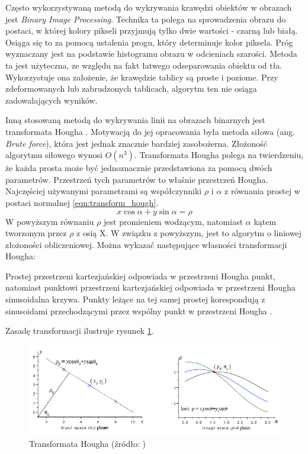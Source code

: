 Często wykorzystywaną metodą do wykrywania krawędzi obiektów w obrazach jest \textit{Binary Image Processing}.
Technika ta polega na sprowadzenia obrazu do postaci, w której kolory pikseli przyjmują tylko dwie wartości - czarną lub białą.
Osiąga się to za pomocą ustalenia progu, który determinuje kolor piksela.
Próg wyznaczany jest na podstawie histogramu obrazu w odcieniach szarości.
Metoda ta jest użyteczna, ze względu na fakt łatwego odseparowania obiektu od tła.
Wykorzystuje ona założenie, że krawędzie tablicy są proste i poziome.
Przy zdeformowanych lub zabrudzonych tablicach, algorytm ten nie osiąga zadowalających wyników.

Inną stosowaną metodą do wykrywania linii na obrazach binarnych jest transformata Hougha \cite{DuanBuildingAA}.
Motywacją do jej opracowania była metoda siłowa (ang. \textit{Brute force}), która jest jednak znacznie bardziej zasobożerna.
Złożoność algorytmu siłowego wynosi $O(n^3)$.
Transformata Hougha polega na twierdzeniu, że każda prosta może być jednoznacznie przedstawiona za pomocą dwóch parametrów.
Przestrzeń tych parametrów to właśnie przestrzeń Hougha.
Najczęściej używanymi parametrami są współczynniki $\rho$ i $\alpha$ z równania prostej w postaci normalnej \eqref{eqn:transform_hough}.
\begin{equation}
    \label{eqn:transform_hough}
    x\cos{\alpha} + y\sin{\alpha} = \rho
\end{equation}
W powyższym równaniu $\rho$ jest promieniem wodzącym, natomiast $\alpha$ kątem tworzonym przez $\rho$ z osią X.
W związku z powyższym, jest to algorytm o liniowej złożoności obliczeniowej.
Można wykazać następujące własności transformacji Hougha:\\
\begin{theorem}
    Prostej przestrzeni kartezjańskiej odpowiada w przestrzeni Hougha punkt, natomiast
    punktowi przestrzeni kartezjańskiej odpowiada w przestrzeni Hougha sinusoidalna krzywa.
    Punkty leżące na tej samej prostej korespondują z sinusoidami przechodzącymi przez
    wspólny punkt w przestrzeni Hougha \cite{hough_transform_definition}.
\end{theorem}
Zasadę transformacji ilustruje rysunek \ref{fig:hough_transform}.
\begin{figure}[!ht]
    \centering
    \includegraphics[scale=1]{Pictures/hough_transform.jpeg}
    \caption{Transformata Hougha (źródło: \cite{Lin:01})}
    \label{fig:hough_transform}
\end{figure}
\FloatBarrier

